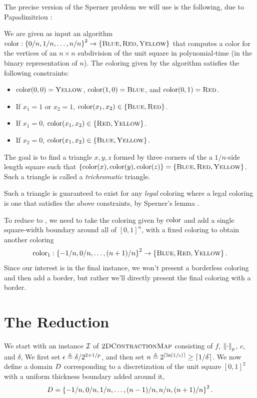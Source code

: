 The precise version of the Sperner problem we will use is the following, due to Papadimitriou \cite{papadimitriou1994complexity}:
\begin{definition}[\Sperner] 
  \label{def:Sperner}
  We are given as input an algorithm $\operatorname{color}: \left\{ 0/n,1/n,\dotsc,n/n \right\}^2 \to \left\{ \textsc{Blue}, \textsc{Red}, \textsc{Yellow} \right\}$ that computes a color for the vertices of an $n\times n$ subdivision of the unit square in polynomial-time (in the binary representation of $n$). The coloring given by the algorithm satisfies the following constraints:
  \begin{itemize}
  \item $\operatorname{color}(0, 0) = \textsc{Yellow}$, $\operatorname{color}(1, 0) = \textsc{Blue}$, and $\operatorname{color}(0, 1) = \textsc{Red}$.
  \item If $x_1 = 1$ or $x_2 = 1$, $\operatorname{color}(x_1,x_2) \in \left\{ \textsc{Blue}, \textsc{Red} \right\}$.
  \item If $x_1 = 0$, $\operatorname{color}(x_1,x_2) \in \left\{ \textsc{Red}, \textsc{Yellow} \right\}$.
  \item If $x_2 = 0$, $\operatorname{color}(x_1,x_2) \in \left\{ \textsc{Blue}, \textsc{Yellow} \right\}$.
  \end{itemize}

  The goal is to find a triangle $x,y,z$ formed by three corners of the a $1/n$-side length square such that $\left\{ \operatorname{color}(x),\operatorname{color}(y),\operatorname{color}(z) \right\} = \left\{ \textsc{Blue},\textsc{Red},\textsc{Yellow} \right\}$. Such a triangle is called a \emph{trichromatic} triangle.
\end{definition}

Such a triangle is guaranteed to exist for any \emph{legal} coloring where a legal coloring is one that satisfies the above constraints, by Sperner's lemma \cite{papadimitriou1994complexity}.

To reduce \Sperner to \EOL, we need to take the coloring given by $\operatorname{color}$ and add a single square-width boundary around all of $[0,1]^n$, with a fixed coloring to obtain another coloring \[\operatorname{color}_1 : \left\{ -1/n,0/n,\dotsc,(n+1)/n \right\}^2 \to \left\{ \textsc{Blue}, \textsc{Red}, \textsc{Yellow} \right\}\text{.}\]  Since our interest is in the final \EOPL instance, we won't present a borderless coloring and then add a border, but rather we'll directly present the final coloring with a border.

\section{The Reduction}
We start with an instance $\mbox{${\mathcal I}$}$ of $\textsc{2DContractionMap}$ consisting of $f$, $\left\| \cdot \right\|_p$, $c$, and $\delta$, We first set $\epsilon \triangleq \delta/2^{2+1/p}$, and then set $n \triangleq 2^{\left\lceil \ln(1/\epsilon) \right\rceil} \geq \left\lceil 1/\delta \right\rceil$. We now define a domain $D$ corresponding to a discretization of the unit square $[0,1]^2$ with a uniform thickness boundary added around it,
\[D = \left\{ -1/n,0/n,1/n,\dotsc,(n-1)/n,n/n,(n+1)/n \right\}^2\text{.}\]

